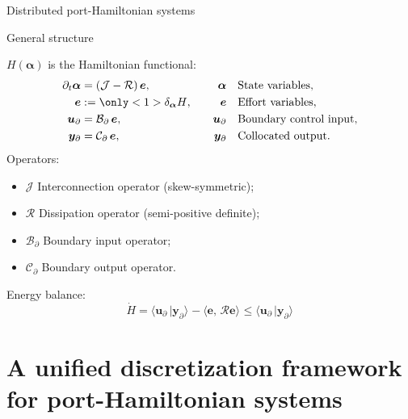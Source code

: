\documentclass{beamer}
\newcommand{\inpr}[3][]{\ensuremath{\langle #2, \, #3 \rangle_{#1}}}
\newcommand{\dualpr}[3][]{\ensuremath{\langle #2 \, \vert #3 \rangle_{#1}}}
\begin{document}
\begin{frame}{Distributed port-Hamiltonian systems}
	
	\begin{block}{General structure}
		
		$H(\bm{\alpha})$ is the Hamiltonian functional:
		\begin{equation*}
			\begin{aligned}
				\partial_t {\bm{\alpha}} &= (\mathcal{J} - \mathcal{R}) \, \bm{e}, \\
				\bm{e} &:= \only<1>{\delta_{\bm{\alpha}}{H}}, \\
				\bm{u}_\partial &= \mathcal{B}_\partial  \, \bm{e}, \\
				\bm{y}_\partial &= \mathcal{C}_\partial \, \bm{e}, 
			\end{aligned} \qquad
			\begin{aligned}
				\bm{\alpha} &\quad\text{State variables},\\
				\bm{e} &\quad\text{Effort variables},\\
				\bm{u}_\partial &\quad\text{Boundary control input}, \\
				\bm{y}_\partial &\quad\text{Collocated output}. 
			\end{aligned}
		\end{equation*}
	Operators:
	\begin{itemize}
		\item $\mathcal{J}$ Interconnection operator (skew-symmetric);
		\item $\mathcal{R}$ Dissipation operator (semi-positive definite);
		\item $\mathcal{B}_\partial$ Boundary input operator; 
		\item $\mathcal{C}_\partial$ Boundary output operator. 
	\end{itemize}
	Energy balance:
	\begin{equation*}
	 \dot{H} = \dualpr{\bm{u}_\partial}{\bm{y}_\partial} - \inpr{\bm{e}}{\mathcal{R}\bm{e}} \le \dualpr{\bm{u}_\partial}{\bm{y}_\partial}
	\end{equation*}
	\end{block}
	
	
\end{frame}



\section{A unified discretization framework for port-Hamiltonian systems}
\end{document}
